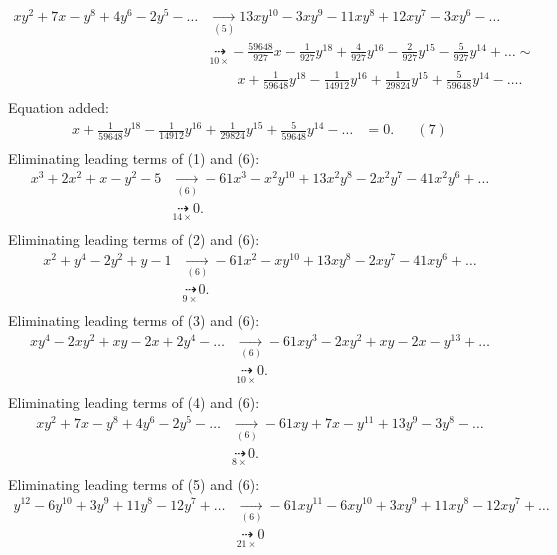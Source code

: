 {\begin{align*}
xy^{2}+7x-y^{8}+4y^{6}-2y^{5}-\ldots&\underset{(5)}{\rightarrow}13xy^{10}-3xy^{9}-11xy^{8}+12xy^{7}-3xy^{6}-\ldots
\\ &\underset{10\times}{\dashrightarrow}-\frac{59648}{927}x-\frac{1}{927}y^{18}+\frac{4}{927}y^{16}-\frac{2}{927}y^{15}-\frac{5}{927}y^{14}+\ldots
\sim \\ &\qquad x+\frac{1}{59648}y^{18}-\frac{1}{14912}y^{16}+\frac{1}{29824}y^{15}+\frac{5}{59648}y^{14}-\ldots
.\\ \end{align*}
Equation added:
\begin{align*}
x+\frac{1}{59648}y^{18}-\frac{1}{14912}y^{16}+\frac{1}{29824}y^{15}+\frac{5}{59648}y^{14}-\ldots&= 0. &&(7)\\
\end{align*}
Eliminating leading terms of (1) and (6):
\begin{align*}
x^{3}+2x^{2}+x-y^{2}-5&\underset{(6)}{\rightarrow}-61x^{3}-x^{2}y^{10}+13x^{2}y^{8}-2x^{2}y^{7}-41x^{2}y^{6}+\ldots
\\ &\underset{14\times}{\dashrightarrow}0
.\\ \end{align*}
Eliminating leading terms of (2) and (6):
\begin{align*}
x^{2}+y^{4}-2y^{2}+y-1&\underset{(6)}{\rightarrow}-61x^{2}-xy^{10}+13xy^{8}-2xy^{7}-41xy^{6}+\ldots
\\ &\underset{9\times}{\dashrightarrow}0
.\\ \end{align*}
Eliminating leading terms of (3) and (6):
\begin{align*}
xy^{4}-2xy^{2}+xy-2x+2y^{4}-\ldots&\underset{(6)}{\rightarrow}-61xy^{3}-2xy^{2}+xy-2x-y^{13}+\ldots
\\ &\underset{10\times}{\dashrightarrow}0
.\\ \end{align*}
Eliminating leading terms of (4) and (6):
\begin{align*}
xy^{2}+7x-y^{8}+4y^{6}-2y^{5}-\ldots&\underset{(6)}{\rightarrow}-61xy+7x-y^{11}+13y^{9}-3y^{8}-\ldots
\\ &\underset{8\times}{\dashrightarrow}0
.\\ \end{align*}
Eliminating leading terms of (5) and (6):
\begin{align*}
y^{12}-6y^{10}+3y^{9}+11y^{8}-12y^{7}+\ldots&\underset{(6)}{\rightarrow}-61xy^{11}-6xy^{10}+3xy^{9}+11xy^{8}-12xy^{7}+\ldots
\\ &\underset{21\times}{\dashrightarrow}0

\end{align*}}
